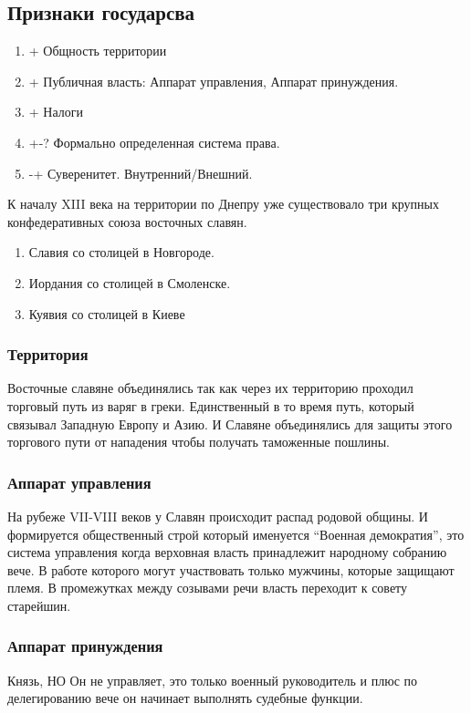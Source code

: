 \documentclass[a4paper]{article}
\begin{document}
\subsection{Признаки государсва}
\begin{enumerate}
    \item + Общность территории
    \item + Публичная власть: Аппарат управления, Аппарат принуждения.
    \item + Налоги
    \item +-? Формально определенная система права.
    \item -+ Суверенитет. Внутренний/Внешний.
\end{enumerate}

К началу XIII века на территории по Днепру уже существовало три крупных конфедеративных союза восточных славян.
\begin{enumerate}
    \item Славия со столицей в Новгороде.
    \item Иордания со столицей в Смоленске.
    \item Куявия со столицей в Киеве
\end{enumerate}

\subsubsection{Территория}
Восточные славяне объединялись так как через их территорию проходил торговый путь из варяг в греки. Единственный в то время путь, который связывал Западную Европу и Азию. И Славяне объединялись для защиты этого торгового пути от нападения чтобы получать таможенные пошлины.

\subsubsection{Аппарат управления}
На рубеже VII-VIII веков у Славян происходит распад родовой общины. И формируется общественный строй который именуется ``Военная демократия'', это система управления когда верховная власть принадлежит народному собранию вече. В работе которого могут участвовать только мужчины, которые защищают племя. В промежутках между созывами речи власть переходит к совету старейшин.

\subsubsection{Аппарат принуждения}
Князь, НО Он не управляет, это только военный руководитель и плюс по делегированию вече он начинает выполнять судебные функции.
\end{document}
